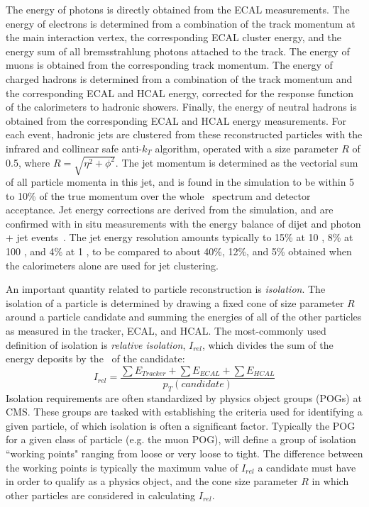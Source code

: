 The energy of photons is directly obtained from the ECAL measurements. The energy of electrons is determined from a combination of the track momentum at the main interaction vertex, the corresponding ECAL cluster energy, and the energy sum of all bremsstrahlung photons attached to the track. The energy of muons is obtained from the corresponding track momentum. The energy of charged hadrons is determined from a combination of the track momentum and the corresponding ECAL and HCAL energy, corrected for the response function of the calorimeters to hadronic showers. Finally, the energy of neutral hadrons is obtained from the corresponding ECAL and HCAL energy measurements.
For each event, hadronic jets are clustered from these reconstructed particles with the infrared and collinear safe anti-$k_T$ algorithm, operated with a size parameter $R$ of 0.5, where $R = \sqrt{\eta^2 + \phi^2}$\cite{Chatrchyan:2011ds}. The jet momentum is determined as the vectorial sum of all particle momenta in this jet, and is found in the simulation to be within 5 to 10\% of the true momentum over the whole \pt ~spectrum and detector acceptance. Jet energy corrections are derived from the simulation, and are confirmed with in situ measurements with the energy balance of dijet and photon + jet events~\cite{Chatrchyan:2011ds}. The jet energy resolution amounts typically to 15\% at 10 \GeV, 8\% at 100 \GeV, and 4\% at 1 \TeV, to be compared to about 40\%, 12\%, and 5\% obtained when the calorimeters alone are used for jet clustering.

An important quantity related to particle reconstruction is \textit{isolation}. The isolation of a particle is determined by drawing a fixed cone of size parameter $R$ around a particle candidate and summing the energies of all of the other particles as measured in the tracker, ECAL, and HCAL. The most-commonly used definition of isolation is \textit{relative isolation}, $I_{rel}$, which divides the sum of the energy deposits by the \pt ~of the candidate:
\begin{equation} \label{eq:iso}
I_{rel} = \frac{\sum E_{Tracker} + \sum E_{ECAL} + \sum E_{HCAL}}{p_T(candidate)}
\end{equation}
\noindent Isolation requirements are often standardized by physics object groups (POGs) at CMS. These groups are tasked with establishing the criteria used for identifying a given particle, of which isolation is often a significant factor. Typically the POG for a given class of particle (e.g. the muon POG), will define a group of isolation ``working points" ranging from loose or very loose to tight. The difference between the working points is typically the maximum value of $I_{rel}$ a candidate must have in order to qualify as a physics object, and the cone size parameter $R$ in which other particles are considered in calculating $I_{rel}$.

